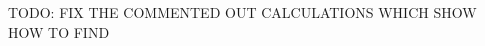 TODO: FIX THE COMMENTED OUT CALCULATIONS WHICH SHOW HOW TO FIND 

\begin{comment}

If we write
%
\[ F_\nu(x) = \frac{1}{\text{Im} ( |x|^2 - (t + i0)^2 )^{\frac{d-1}{2} + \nu}}, \]
%
then the Gauss Lemma argument given above shows that

As the main term, let us try and find a forward fundamental solution to the operator $\partial_t^2 - L$, i.e. to try and find a distribution $E_+$ such that $(\partial_t^2 - L) E_+ = \delta_0$. The trick to doing this is to note that a simple calculation, together with the Gauss Lemma, we conclude that for a smooth, \emph{radial} function $E \in C^\infty(B)$, with $E(x) = F(x \cdot x)$, we have
%
\[ (\nabla E)(x) = 2 x\; F'(x \cdot x) = \nabla_g E(x). \]
%
If $E_0: B \times \RR \to \CC$ is the forward fundamental solution to the wave equation on $\RR \times \RR^d$, then $E_0$ is the weak limit of operators of the form
%
\[ E_\varepsilon(x,t) = c_d \cdot \frac{H(t)}{\text{Im} \left\{ \left(|x|^2 - (t + i \varepsilon)^2 \right)^{\frac{d-1}{2}} \right\}}. \]
%
We can write $E_\varepsilon(x,t) = F_\varepsilon(x \cdot x,t)$, and then it follows that
%
\begin{align*}
    (\partial_t^2 - L) E_0 &= \lim_{\varepsilon \to 0} (\partial_t^2 - L) E_\varepsilon\\
    &= \lim_{\varepsilon \to 0} (\partial_t^2 - \nabla \cdot \nabla_g) E_\varepsilon\\
    &= \lim_{\varepsilon \to 0} (\partial_t^2 - \nabla \cdot \nabla) E_\varepsilon\\
    &= (\partial_t^2 - \nabla \cdot \nabla) E_0\\
    &= \Box E_0 = \delta.
\end{align*}
%
We therefore see that
%
\[ \Box_g E_0 = \delta - R E_0 = \delta - \Big\{ \text{First Order Terms} \Big\}. \]
%
We can do even between than this. Consider some radial, smooth function $\alpha_0: B \to \RR$ with $\alpha(0) = 1$, and $\alpha_0(x) = A(|x|^2)$. Let $(\nabla \alpha_0)(x) = x A(x \cdot x)$ and let $(\nabla E_0)(x) = x F_0(x \cdot x)$. Then
%
\begin{align*}
    \Box_g \{ \alpha_0 E_0 \} &= \alpha_0 \partial_t^2 E_0 - \left[ L \{ \alpha_0 E_0 \} + R \{ \alpha_0 E_0 \} \right]\\
    &= \alpha_0 (\partial_t^2 E_0 - L E_0) - \left[ (\Delta_g \alpha_0) E_0 + 2 (\nabla \alpha_0 \cdot \nabla E_0) + \alpha_0 R E_0 \right]\\
    &= \alpha_0 \cdot \delta - [ (\Delta_g \alpha_0) E_0 + 2 F_0(|x|^2) \left( 2 A'(|x|^2) |x|^2 + A(|x|^2) (a_G \cdot x) \right) ] 
\end{align*}
%
TODO: KEEP PERFORMING THIS CALCULATION.


\end{comment}
